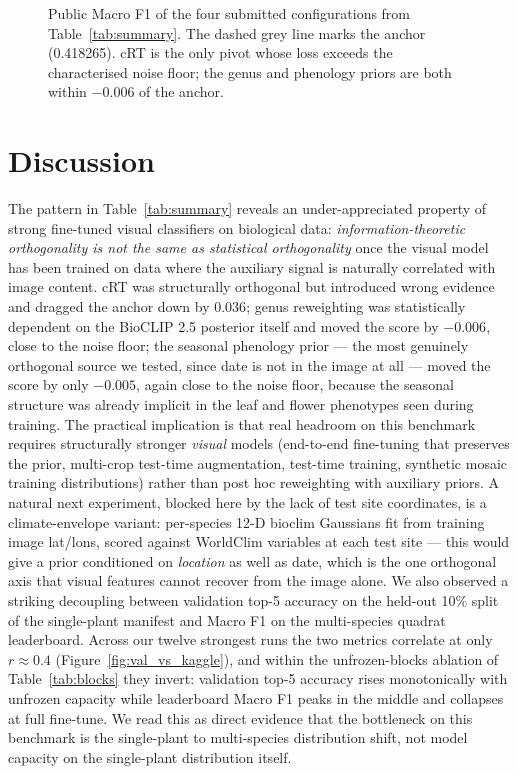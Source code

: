 \documentclass[sigconf]{ceurart}
\begin{document}
\begin{figure}[!htbp]
  \centering
  
  \caption{Public Macro F1 of the four submitted configurations from Table~\ref{tab:summary}. The dashed grey line marks the anchor (0.418265). cRT is the only pivot whose loss exceeds the characterised noise floor; the genus and phenology priors are both within $-0.006$ of the anchor.}
  \label{fig:aggregate_deltas}
\end{figure}
\section{Discussion}
\label{sec:discussion}
The pattern in Table~\ref{tab:summary} reveals an under-appreciated property of strong fine-tuned visual classifiers on biological data: \emph{information-theoretic orthogonality is not the same as statistical orthogonality} once the visual model has been trained on data where the auxiliary signal is naturally correlated with image content. cRT was structurally orthogonal but introduced wrong evidence and dragged the anchor down by $0.036$; genus reweighting was statistically dependent on the BioCLIP 2.5 posterior itself and moved the score by $-0.006$, close to the noise floor; the seasonal phenology prior --- the most genuinely orthogonal source we tested, since date is not in the image at all --- moved the score by only $-0.005$, again close to the noise floor, because the seasonal structure was already implicit in the leaf and flower phenotypes seen during training.
The practical implication is that real headroom on this benchmark requires structurally stronger \emph{visual} models (end-to-end fine-tuning that preserves the prior, multi-crop test-time augmentation, test-time training, synthetic mosaic training distributions) rather than post hoc reweighting with auxiliary priors. A natural next experiment, blocked here by the lack of test site coordinates, is a climate-envelope variant: per-species 12-D bioclim Gaussians fit from training image lat/lons, scored against WorldClim variables at each test site --- this would give a prior conditioned on \emph{location} as well as date, which is the one orthogonal axis that visual features cannot recover from the image alone.
We also observed a striking decoupling between validation top-5 accuracy on the held-out 10\% split of the single-plant manifest and Macro F1 on the multi-species quadrat leaderboard. Across our twelve strongest runs the two metrics correlate at only $r \approx 0.4$ (Figure~\ref{fig:val_vs_kaggle}), and within the unfrozen-blocks ablation of Table~\ref{tab:blocks} they invert: validation top-5 accuracy rises monotonically with unfrozen capacity while leaderboard Macro F1 peaks in the middle and collapses at full fine-tune. We read this as direct evidence that the bottleneck on this benchmark is the single-plant to multi-species distribution shift, not model capacity on the single-plant distribution itself.
\end{document}
